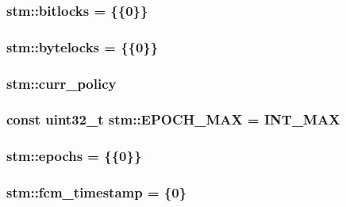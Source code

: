 \hypertarget{namespacestm_a5984f2381f2e7e81b5e647d6e7f9ebe3}{
\subsubsection[{bitlocks}]{ stm\-::bitlocks = \{\{0\}\}}}\label{namespacestm_a5984f2381f2e7e81b5e647d6e7f9ebe3}
\hypertarget{namespacestm_abea1740c6c56b45f46aa26a594caadb6}{
\subsubsection[{bytelocks}]{ stm\-::bytelocks = \{\{0\}\}}}\label{namespacestm_abea1740c6c56b45f46aa26a594caadb6}
\hypertarget{namespacestm_ab5f6db774c01e9a0e2aec0173d0481b1}{
\subsubsection[{curr\-\_\-policy}]{ stm\-::curr\-\_\-policy}}\label{namespacestm_ab5f6db774c01e9a0e2aec0173d0481b1}
\hypertarget{namespacestm_ad8467c8fd66bee04be744334bc17b75e}{
\subsubsection[{E\-P\-O\-C\-H\-\_\-\-M\-A\-X}]{\setlength{\rightskip}{0pt plus 5cm}const uint32\-\_\-t stm\-::\-E\-P\-O\-C\-H\-\_\-\-M\-A\-X = I\-N\-T\-\_\-\-M\-A\-X\hspace{0.3cm}{\ttfamily [static]}}}\label{namespacestm_ad8467c8fd66bee04be744334bc17b75e}
\hypertarget{namespacestm_a162bd0b45643942e59ea68af00fec992}{
\subsubsection[{epochs}]{ stm\-::epochs = \{\{0\}\}}}\label{namespacestm_a162bd0b45643942e59ea68af00fec992}
\hypertarget{namespacestm_a05cd8e71fbf5f13425c1c6db187bb583}{
\subsubsection[{fcm\-\_\-timestamp}]{ stm\-::fcm\-\_\-timestamp = \{0\}}}\label{namespacestm_a05cd8e71fbf5f13425c1c6db187bb583}

